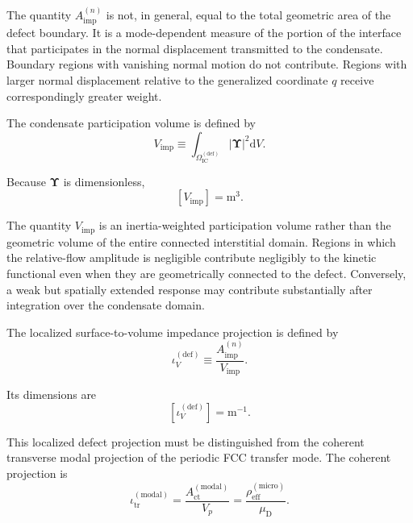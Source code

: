 The quantity \(A_{\mathrm{imp}}^{(n)}\) is not, in general, equal to the total geometric area of the defect boundary. It is a mode-dependent measure of the portion of the interface that participates in the normal displacement transmitted to the condensate. Boundary regions with vanishing normal motion do not contribute. Regions with larger normal displacement relative to the generalized coordinate \(q\) receive correspondingly greater weight.

The condensate participation volume is defined by
\begin{equation}
    V_{\mathrm{imp}}
    \equiv
    \int_{\Omega_{\mathrm{IC}}^{(\mathrm{def})}}
    \left|
    \boldsymbol{\Upsilon}
    \right|^2
    \mathrm{d}V .
\end{equation}

Because \(\boldsymbol{\Upsilon}\) is dimensionless,
\begin{equation}
    \left[
    V_{\mathrm{imp}}
    \right]
    =
    \mathrm{m}^3 .
\end{equation}

The quantity \(V_{\mathrm{imp}}\) is an inertia-weighted participation volume rather than the geometric volume of the entire connected interstitial domain. Regions in which the relative-flow amplitude is negligible contribute negligibly to the kinetic functional even when they are geometrically connected to the defect. Conversely, a weak but spatially extended response may contribute substantially after integration over the condensate domain.

The localized surface-to-volume impedance projection is defined by
\begin{equation}
    \label{eq:AP_defect_projection}
    \iota_V^{(\mathrm{def})}
    \equiv
    \frac{
    A_{\mathrm{imp}}^{(n)}
    }{
    V_{\mathrm{imp}}
    } .
\end{equation}

Its dimensions are
\begin{equation}
    \left[
    \iota_V^{(\mathrm{def})}
    \right]
    =
    \mathrm{m}^{-1}.
\end{equation}

This localized defect projection must be distinguished from the coherent transverse modal projection of the periodic FCC transfer mode. The coherent projection is
\begin{equation}
    \iota_{\mathrm{tr}}^{(\mathrm{modal})}
    =
    \frac{
    A_{\mathrm{ct}}^{(\mathrm{modal})}
    }{
    V_p
    }
    =
    \frac{
    \rho_{\mathrm{eff}}^{(\mathrm{micro})}
    }{
    \mu_{\mathrm D}
    } .
\end{equation}

